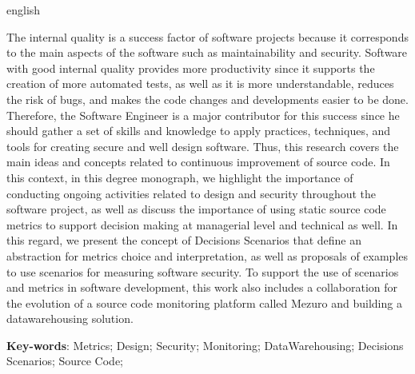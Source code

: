 \begin{resumo}[Abstract]
  \begin{otherlanguage*}{english} 
  
The internal quality is a success factor of software projects because it corresponds to the main aspects of the software such as maintainability and security. Software with good internal quality provides more productivity since it supports the creation of more automated tests, as well as it is more understandable, reduces the risk of bugs, and makes the code changes and developments easier to be done. Therefore, the Software Engineer is a major contributor for this success since he should gather a set of skills and knowledge to apply practices, techniques, and tools for creating secure and well design software. Thus, this research covers the main ideas and concepts related to continuous improvement of source code. In this context, in this degree monograph, we highlight the importance of conducting ongoing activities related to design and security throughout the software project, as well as discuss the importance of using static source code metrics to support decision making at managerial level and technical as well. In this regard, we present the concept of Decisions Scenarios that define an abstraction for metrics choice and interpretation, as well as proposals of examples to use scenarios for measuring software security. To support the use of scenarios and metrics in software development, this work also includes a collaboration for the evolution of a source code monitoring platform called Mezuro and building a datawarehousing solution.
  
  \vspace{\onelineskip}
 
  \noindent 
  \textbf{Key-words}: Metrics; Design; Security; Monitoring; DataWarehousing; Decisions Scenarios; Source Code;
  \end{otherlanguage*}
\end{resumo}


